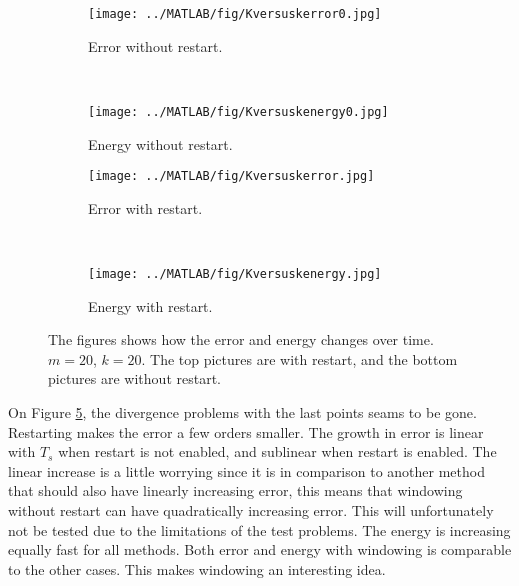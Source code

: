 \begin{figure}[H]
        \centering
        \begin{subfigure}[b]{0.3\textwidth}
                \texttt{[image: ../MATLAB/fig/Kversuskerror0.jpg]}
                \caption{ Error without restart. }
                \label{fig:Kversuskerror0}
        \end{subfigure}
		~
		\begin{subfigure}[b]{0.3\textwidth}
                \texttt{[image: ../MATLAB/fig/Kversuskenergy0.jpg]}
                \caption{ Energy without restart. }
                \label{fig:Kversuskenergy0}
        \end{subfigure}

        \begin{subfigure}[b]{0.3\textwidth}
                \texttt{[image: ../MATLAB/fig/Kversuskerror.jpg]}
                \caption{ Error with restart. }
                \label{fig:Kversuskerror}
        \end{subfigure}
		~
		\begin{subfigure}[b]{0.3\textwidth}
                \texttt{[image: ../MATLAB/fig/Kversuskenergy.jpg]}
                \caption{ Energy with restart. }
                \label{fig:Kversuskenergy}
        \end{subfigure}        
        
        \caption{ The figures shows how the error and energy changes over time. $m = 20$, $k= 20$. The top pictures are with restart, and the bottom pictures are without restart. }
        \label{fig:Kversusk}
\end{figure}
On Figure \ref{fig:Kversusk}, the divergence problems with the last points seams to be gone. Restarting makes the error a few orders smaller. The growth in error is linear with $T_s$ when restart is not enabled, and sublinear when restart is enabled. The linear increase is a little worrying since it is in comparison to another method that should also have linearly increasing error, this means that windowing without restart can have quadratically increasing error. This will unfortunately not be tested due to the limitations of the test problems. The energy is increasing equally fast for all methods.
Both error and energy with windowing is comparable to the other cases. This makes windowing an interesting idea.
